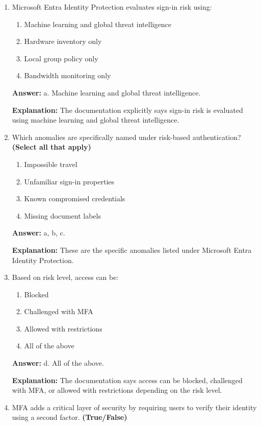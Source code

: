 \documentclass[10pt]{article}
\begin{document}
\begin{enumerate}[leftmargin=*]
\textbf{Explanation:} The documentation highlights simulation as a way to keep verification rigorous and user-friendly.

\item Microsoft Entra Identity Protection evaluates sign-in risk using:
\begin{enumerate}[label=\alph*., leftmargin=1.5em]
\item Machine learning and global threat intelligence
\item Hardware inventory only
\item Local group policy only
\item Bandwidth monitoring only
\end{enumerate}
\textbf{Answer:} a. Machine learning and global threat intelligence.

\textbf{Explanation:} The documentation explicitly says sign-in risk is evaluated using machine learning and global threat intelligence.

\item Which anomalies are specifically named under risk-based authentication? \textbf{(Select all that apply)}
\begin{enumerate}[label=\alph*., leftmargin=1.5em]
\item Impossible travel
\item Unfamiliar sign-in properties
\item Known compromised credentials
\item Missing document labels
\end{enumerate}
\textbf{Answer:} a, b, c.

\textbf{Explanation:} These are the specific anomalies listed under Microsoft Entra Identity Protection.

\item Based on risk level, access can be:
\begin{enumerate}[label=\alph*., leftmargin=1.5em]
\item Blocked
\item Challenged with MFA
\item Allowed with restrictions
\item All of the above
\end{enumerate}
\textbf{Answer:} d. All of the above.

\textbf{Explanation:} The documentation says access can be blocked, challenged with MFA, or allowed with restrictions depending on the risk level.

\item MFA adds a critical layer of security by requiring users to verify their identity using a second factor. \textbf{(True/False)}


\end{enumerate}
\end{document}
